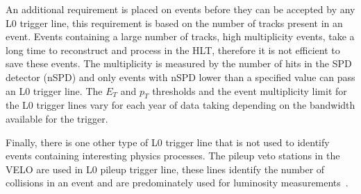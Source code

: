 An additional requirement is placed on events before they can be accepted by any L0 trigger line, this requirement is based on the number of tracks present in an event.
Events containing a large number of tracks, high multiplicity events, take a long time to reconstruct and process in the HLT, therefore it is not efficient to save these events.
The multiplicity is measured by the number of hits in the SPD detector (nSPD) and only events with nSPD lower than a specified value can pass an L0 trigger line.
The $E_{T}$ and $p_{T}$ thresholds and the event multiplicity limit for the L0 trigger lines vary for each year of data taking depending on the bandwidth available for the trigger. %

Finally, there is one other type of L0 trigger line that is not used to identify events containing interesting physics processes. The pileup veto stations in the VELO are used in L0 pileup trigger line, these lines identify the number of collisions in an event and are predominately used for luminosity measurements~\cite{Aaij:2011er}.

